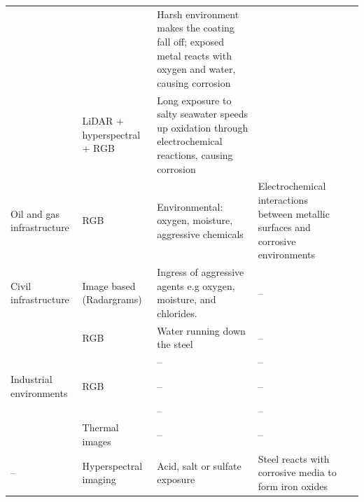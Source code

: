 {\begin{xltabular}{\textwidth}{>{\RaggedRight\arraybackslash}p{2.3cm}>{\RaggedRight\arraybackslash}p{3.0cm}>{\RaggedRight\arraybackslash}X>{\RaggedRight\arraybackslash}p{3.2cm}>{\RaggedRight\arraybackslash}p{1.0cm}}
 &  & Harsh environment makes the coating fall off; exposed metal reacts with oxygen and water, causing corrosion &  & \citep{Hu2023} \\
 & LiDAR + hyperspectral + RGB & Long exposure to salty seawater speeds up oxidation through electrochemical reactions, causing corrosion &  & \citep{PallasEnguita2025} \\
\midrule
Oil and gas infrastructure & RGB & Environmental: oxygen, moisture, aggressive chemicals & Electrochemical interactions between metallic surfaces and corrosive  environments & \citep{Alvani2026} \\
\midrule
Civil infrastructure & Image based (Radargrams) & Ingress of aggressive agents e.g oxygen, moisture, and chlorides. & -- & \citep{Bui2026} \\
 & RGB & Water running down the steel & -- & \citep{Savino2025} \\
 &  & -- & -- & \citep{Maharjan2025} \\
\midrule
Industrial environments & RGB & -- & -- & \citep{Espinoza2026} \\
 &  & -- & -- & \citep{Nash2022} \\
 & Thermal images & -- & -- & \citep{Doshvarpassand2022} \\
\midrule
-- & Hyperspectral imaging & Acid, salt or sulfate exposure & Steel reacts with corrosive media to form iron oxides & \citep{Lavadiya2022} \\
\end{xltabular}
}



